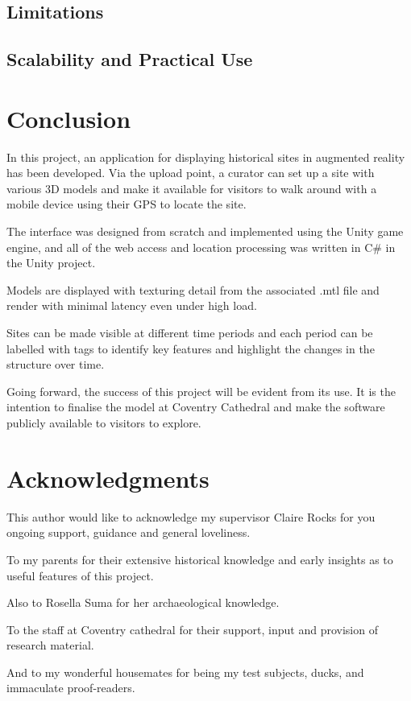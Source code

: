 \documentclass{article}
\begin{document}
\subsection{Limitations}
\subsection{Scalability and Practical Use}

\section{Conclusion}
In this project, an application for displaying historical sites in augmented reality has been developed. Via the upload point, a curator can set up a site with various 3D models and make it available for visitors to walk around with a mobile device using their GPS to locate the site. 

The interface was designed from scratch and implemented using the Unity game engine, and all of the web access and location processing was written in C\# in the Unity project. 

Models are displayed with texturing detail from the associated .mtl file and render with minimal latency even under high load. 

Sites can be made visible at different time periods and each period can be labelled with tags to identify key features and highlight the changes in the structure over time.

Going forward, the success of this project will be evident from its use. It is the intention to finalise the model at Coventry Cathedral and make the software publicly available to visitors to explore.

\section{Acknowledgments}
This author would like to acknowledge my supervisor Claire Rocks for you ongoing support, guidance and general loveliness.

To my parents for their extensive historical knowledge and early insights as to useful features of this project.

Also to Rosella Suma for her archaeological knowledge.

To the staff at Coventry cathedral for their support, input and provision of research material.

And to my wonderful housemates for being my test subjects, ducks, and immaculate proof-readers.
\end{document}
